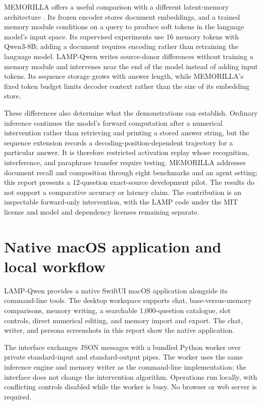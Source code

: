 \documentclass[manuscript,screen,nonacm]{acmart}
\begin{document}
MEMORILLA offers a useful comparison with a different latent-memory architecture \cite{memorilla}. Its frozen encoder stores document embeddings, and a trained memory module conditions on a query to produce soft tokens in the language model's input space. Its supervised experiments use 16 memory tokens with Qwen3-8B; adding a document requires encoding rather than retraining the language model. LAMP-Qwen writes source-donor differences without training a memory module and intervenes near the end of the model instead of adding input tokens. Its sequence storage grows with answer length, while MEMORILLA's fixed token budget limits decoder context rather than the size of its embedding store.

These differences also determine what the demonstrations can establish. Ordinary inference continues the model's forward computation after a numerical intervention rather than retrieving and printing a stored answer string, but the sequence extension records a decoding-position-dependent trajectory for a particular answer. It is therefore restricted activation replay whose recognition, interference, and paraphrase transfer require testing. MEMORILLA addresses document recall and composition through eight benchmarks and an agent setting; this report presents a 12-question exact-source development pilot. The results do not support a comparative accuracy or latency claim. The contribution is an inspectable forward-only intervention, with the LAMP code under the MIT license and model and dependency licenses remaining separate.

\section{Native macOS application and local workflow}

LAMP-Qwen provides a native SwiftUI macOS application alongside its command-line tools. The desktop workspace supports chat, base-versus-memory comparisons, memory writing, a searchable 1,000-question catalogue, slot controls, direct numerical editing, and memory import and export. The chat, writer, and persona screenshots in this report show the native application.

The interface exchanges JSON messages with a bundled Python worker over private standard-input and standard-output pipes. The worker uses the same inference engine and memory writer as the command-line implementation; the interface does not change the intervention algorithm. Operations run locally, with conflicting controls disabled while the worker is busy. No browser or web server is required.
\end{document}
